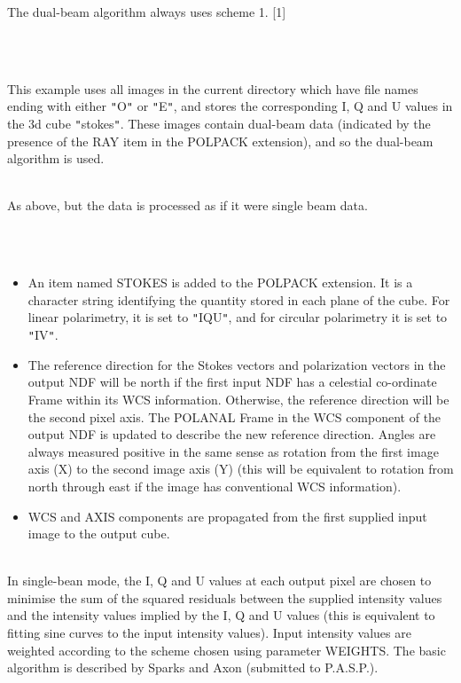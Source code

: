 \documentclass[twoside,11pt]{article}
\renewcommand{\_}{\texttt{\symbol{95}}}
\newlength{\sstexampleslength}
\newcommand{\sstexamples}[1]{
   \item[Examples:] \mbox{} \\
   \vspace{-3.5ex}
   \begin{description}
      #1
   \end{description}
}
\newcommand{\sstexamplesubsection}[2]{\sloppy
\item[\parbox{\sstexampleslength}{\ssttt #1}] \mbox{} \vspace{1.0ex}
\\ #2 }
\newcommand{\sstnotes}[1]{\item[Notes:] \mbox{} \\[1.3ex] #1}
\newcommand{\sstdiytopic}[2]{\item[{\hspace{-0.35em}#1\hspace{-0.35em}:}]
\mbox{} \\[1.3ex] #2}
\newcommand{\sstitemlist}[1]{
  \mbox{} \\
  \vspace{-3.5ex}
  \begin{itemize}
     #1
  \end{itemize}
}
\newcommand{\sstitem}{\item}
\newcommand{\sstexamples}[1]{
      \item[Examples:] \\
      \begin{description}
         #1
      \end{description}
      \\
   }
\newcommand{\sstexamplesubsection}[2]{\item[{\ssttt #1}] #2}
\newcommand{\sstnotes}[1]{\item[Notes:] #1 }
\newcommand{\sstdiytopic}[2]{\item[{#1}] #2 }
\newcommand{\sstitemlist}[1]{
      \begin{itemize}
         #1
      \end{itemize}
      \\
   }
\newcommand{\sstitem}{\item}
\begin{document}
{{{{         }
         The dual-beam algorithm always uses scheme 1. [1]
      }
   }
   \sstexamples{
      \sstexamplesubsection{
         polcal {\tt "}$*$\_O,$*$\_E{\tt "} stokes
      }{
         This example uses all images in the current directory which have
         file names ending with either {\tt "}\_O{\tt "} or {\tt "}\_E{\tt "}, and stores the
         corresponding I, Q and U values in the 3d cube {\tt "}stokes{\tt "}. These
         images contain dual-beam data (indicated by the presence of the
         RAY item in the POLPACK extension), and so the dual-beam
         algorithm is used.
      }
      \sstexamplesubsection{
         polcal {\tt "}$*$\_O,$*$\_E{\tt "} stokes nodualbeam
      }{
         As above, but the data is processed as if it were single beam data.
      }
   }
   \sstnotes{
      \sstitemlist{

         \sstitem
         An item named STOKES is added to the POLPACK extension. It is a
         character string identifying the quantity stored in each plane of
         the cube. For linear polarimetry, it is set to {\tt "}IQU{\tt "}, and for
         circular polarimetry it is set to {\tt "}IV{\tt "}.

         \sstitem
         The reference direction for the Stokes vectors and polarization
         vectors in the output NDF will be north if the first input NDF
         has a celestial co-ordinate Frame within its WCS information. Otherwise,
         the reference direction will be the second pixel axis. The POLANAL
         Frame in the WCS component of the output NDF is updated to describe
         the new reference direction. Angles are always measured positive in the
         same sense as rotation from the first image axis (X) to the second image
         axis (Y) (this will be equivalent to rotation from north through
         east if the image has conventional WCS information).

         \sstitem
         WCS and AXIS components are propagated from the first supplied
         input image to the output cube.
      }
   }
   \sstdiytopic{
      The Single-beam Algorithm
   }{
      In single-bean mode, the I, Q and U values at each output pixel are
      chosen to minimise the sum of the squared residuals between the
      supplied intensity values and the intensity values implied by the I,
      Q and U values (this is equivalent to fitting sine curves to the
      input intensity values). Input intensity values are weighted
      according to the scheme chosen using parameter WEIGHTS. The basic
      algorithm is described by Sparks and Axon (submitted to P.A.S.P.).

}}
\end{document}
